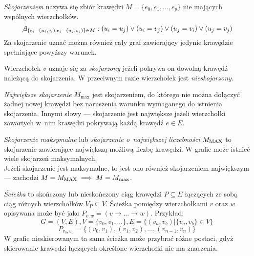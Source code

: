 \begin{definition}
  \emph{Skojarzeniem} nazywa się zbiór krawędzi $M=\{e_0, e_1, \ldots, e_p\}$
  nie mających wspólnych wierzchołków.
  \[\not\exists_{\{e_i=(u_i,v_i), e_j=(u_j, v_j)\} \in M}: (u_i=u_j) \lor (u_i=v_j) \lor (u_j=v_i) \lor (u_j=v_j)\]
  Za skojarzenie uznać można również cały graf zawierający jedynie krawędzie
  spełniające powyższy warunek.
\end{definition}

\begin{definition}
  Wierzchołek $v$ uznaje się za \emph{skojarzony} jeżeli pokrywa on dowolną
  krawędź należącą do skojarzenia.
  W przeciwnym razie wierzchołek jest \emph{nieskojarzony}.
\end{definition}

\begin{definition}
  \emph{Największe skojarzenie} $M_{\max}$ jest skojarzeniem, do którego nie można
  dołączyć żadnej nowej krawędzi bez naruszenia warunku wymaganego do istnienia
  skojarzenia. 
  Innymi słowy --- skojarzenie jest największe jeżeli wierzchołki zawartych w~nim
  krawędzi pokrywają każdą krawędź $e \in E$.
\end{definition}

\begin{definition}
  \emph{Skojarzenie maksymalne} lub \emph{skojarzenie o~największej liczebności}
  $M_{\textnormal{MAX}}$ to skojarzenie zawierające największą możliwą liczbę krawędzi.
  W grafie może istnieć wiele skojarzeń maksymalnych.\\
  Jeżeli skojarzenie jest maksymalne, to jest ono również skojarzeniem największym --- zachodzi $M=M_{\textnormal{MAX}} \implies M=M_{\max}$.
\end{definition}

\begin{definition}
  \emph{Ścieżka} to skończony lub nieskończony ciąg krawędzi 
  $P \subseteq E$ łączących ze sobą ciąg różnych wierzchołków
  $V_P \subseteq V$.
  Ścieżka pomiędzy wierzchołkami $v$ oraz $w$ opisywana może być jako $P_{v,w} = (v \rightarrow \ldots \rightarrow w)$.
  Przykład:
  \[G=(V,E), V=\{v_0, v_1, \ldots\}, E=\{(v_a, v_b)| \{v_a, v_b\} \in V\}\]
  \[P_{v_0, v_n}=\{(v_0, v_1), (v_1, v_2), \ldots, (v_{n-1}, v_n)\}\]
  W grafie nieskierowanym ta sama ścieżka może przybrać różne postaci, gdyż
  skierowanie krawędzi łączących określone wierzchołki nie ma znaczenia.
\end{definition}

